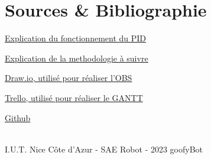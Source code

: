 \section{Sources \& Bibliographie}



\href{http://projet.eu.org/pedago/sin/term/6-asservissement_PID.pdf}{Explication du fonctionnement du PID}


\href{https://lms.univ-cotedazur.fr/2022/mod/resource/view.php?id=160514}{Explication de la methodologie à 
suivre}


\href{https://app.diagrams.net/}{Draw.io, utilisé pour réaliser l'OBS}


\href{https://trello.com/fr}{Trello, utilisé pour réaliser le GANTT}


\href{https://github.com/}{Github}

\vfill
\noindent\makebox[\linewidth]{\rule{.8\paperwidth}{.6pt}}\\[0.2cm]
I.U.T. Nice Côte d'Azur - SAE Robot - 2023 \hfill goofyBot
\noindent\makebox[\linewidth]{\rule{.8\paperwidth}{.6pt}}
\newpage